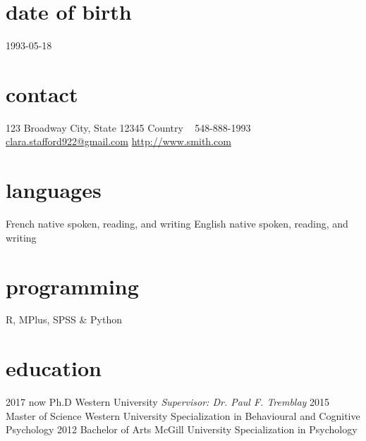 \documentclass[]{k-cv} %
\begin{document}


\begin{aside} %
\section{date of birth}
\color{gray}1993-05-18
\section{contact}
123 Broadway
City, State 12345
Country
~
548-888-1993
~
\href{mailto:clara.stafford922@gmail.com}{clara.stafford922@gmail.com}
\href{http://www.smith.com}{http://www.smith.com}
\section{languages}
French native spoken, reading, and writing
English native spoken, reading, and writing
\section{programming}
R, MPlus, SPSS \& Python
\end{aside}


\section{education}

\begin{entrylist}
\entry
{2017 \to now}
{Ph.D}
{Western University}
{\emph{Supervisor: Dr. Paul F. Tremblay}}
\entry
{2015 }
{Master {\normalfont of Science}}
{Western University}
{Specialization in Behavioural and Cognitive Psychology}
\entry
{2012 }
{Bachelor {\normalfont of Arts}}
{McGill University}
{Specialization in Psychology}
\end{entrylist}
\end{document}
